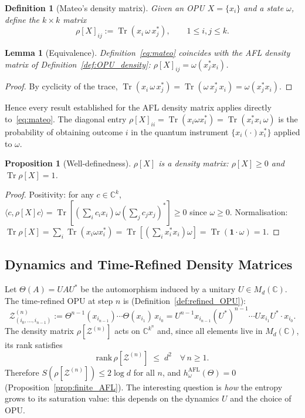\documentclass[12pt,a4paper]{article}
\newtheorem{lemma}[theorem]{Lemma}
\newtheorem{proposition}[theorem]{Proposition}
\newtheorem{definition}[theorem]{Definition}
\DeclareMathOperator{\Tr}{Tr}
\begin{document}
\begin{definition}[Mateo's density matrix]\label{def:mateo_rho}
Given an OPU $X=\{x_i\}$ and a state $\omega$, define the $k\times k$
matrix
\begin{equation}\label{eq:mateo}
  \rho[X]_{ij} := \Tr(x_i\,\omega\, x_j^*),\qquad 1\leq i,j\leq k.
\end{equation}
\end{definition}

\begin{lemma}[Equivalence]\label{lem:equiv}
Definition~\eqref{eq:mateo} coincides with the AFL density matrix of
Definition~\ref{def:OPU_density}: $\rho[X]_{ij}=\omega(x_j^* x_i)$.
\end{lemma}
\begin{proof}
By cyclicity of the trace,
$\Tr(x_i\,\omega\, x_j^*)=\Tr(\omega\, x_j^*\, x_i)=\omega(x_j^* x_i)$.
\end{proof}

Hence every result established for the AFL density matrix applies directly
to~\eqref{eq:mateo}.  The diagonal entry $\rho[X]_{ii}=\Tr(x_i\omega x_i^*)
=\Tr(x_i^* x_i\,\omega)$ is the probability of obtaining outcome $i$ in the
quantum instrument $\{x_i(\cdot)x_i^*\}$ applied to $\omega$.

\begin{proposition}[Well-definedness]\label{prop:well_def}
$\rho[X]$ is a density matrix: $\rho[X]\geq 0$ and $\Tr\rho[X]=1$.
\end{proposition}
\begin{proof}
Positivity: for any $c\in\mathbb{C}^k$,
$\langle c,\rho[X]c\rangle=\Tr\!\left[(\sum_i c_i x_i)\omega(\sum_j c_j x_j)^*\right]\geq 0$
since $\omega\geq 0$.
Normalisation:
$\Tr\rho[X]=\sum_i\Tr(x_i\omega x_i^*)=\Tr\!\left[(\sum_i x_i^* x_i)\omega\right]
=\Tr(\mathbf{1}\cdot\omega)=1$.
\end{proof}

\subsection{Dynamics and Time-Refined Density Matrices}

Let $\Theta(A)=UAU^*$ be the automorphism induced by a unitary
$U\in M_d(\mathbb{C})$.  The time-refined OPU at step $n$ is
(Definition~\ref{def:refined_OPU}):
\[
  \mathcal{Z}^{(n)}_{(i_0,\ldots,i_{n-1})}
  := \Theta^{n-1}(x_{i_{n-1}})\cdots\Theta(x_{i_1})\,x_{i_0}
   = U^{n-1}x_{i_{n-1}}(U^*)^{n-1}\cdots Ux_{i_1}U^*\cdot x_{i_0}.
\]
The density matrix $\rho[\mathcal{Z}^{(n)}]$ acts on $\mathbb{C}^{k^n}$
and, since all elements live in $M_d(\mathbb{C})$, its rank satisfies
\begin{equation}\label{eq:rank_bound}
  \mathrm{rank}\,\rho[\mathcal{Z}^{(n)}]\;\leq\; d^2\quad\forall\,n\geq 1.
\end{equation}
Therefore $S(\rho[\mathcal{Z}^{(n)}])\leq 2\log d$ for all $n$, and
$h_\omega^{\mathrm{AFL}}(\Theta)=0$ (Proposition~\ref{prop:finite_AFL}).
The interesting question is \emph{how} the entropy grows to its saturation
value: this depends on the dynamics $U$ and the choice of OPU.
\end{document}
